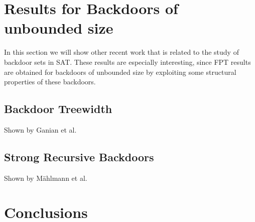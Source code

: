 \documentclass[11pt,a4paper]{article}
\theoremstyle{definition}
\theoremstyle{proposition}
\begin{document}
\section{Results for Backdoors of unbounded size}
\label{sec:unboundedbackdoors}

In this section we will show other recent work that is related to the study of backdoor sets in SAT. These results are especially interesting, since FPT results are obtained for backdoors of unbounded size by exploiting some structural properties of these backdoors. 

\subsection{Backdoor Treewidth}

Shown by Ganian et al. \cite{GanianBackdoorTreewidth}

\subsection{Strong Recursive Backdoors}

Shown by Mählmann et al. \cite{maehlmann2021recursive}

\section{Conclusions}
\label{sec:conclusions}



\end{document}

